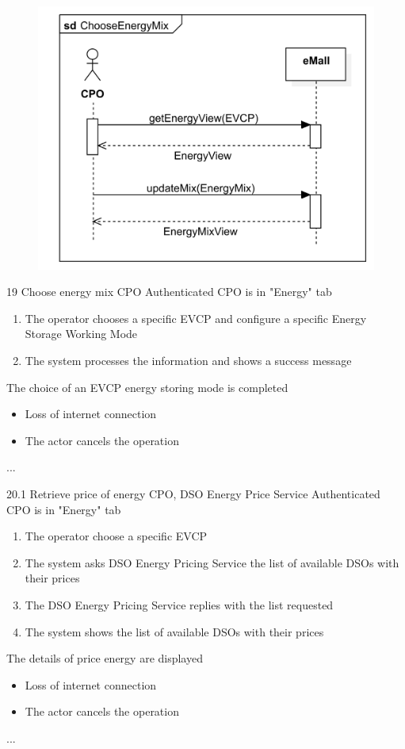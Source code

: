 \pagebreak
\usecase
{
    \begin{figure}[H]
        \centering
        \includegraphics[scale=0.9]{src/sequence_diagram/chooseEnergyMix.png}
    \end{figure}
}
{19}
{Choose energy mix} %
{CPO} %
{Authenticated CPO is in "Energy" tab} %
{ %
    \begin{enumerate}
        \item The operator chooses a specific EVCP and configure a specific Energy Storage Working Mode
        \item The system processes the information and shows a success message
    \end{enumerate}
}
{The choice of an EVCP energy storing mode is completed} %
{ %
    \begin{itemize}
        \item Loss of internet connection
        \item The actor cancels the operation
    \end{itemize}
}
{ %
    ...
}




\usecase
{
}
{20.1}
{Retrieve price of energy} %
{CPO, DSO Energy Price Service} %
{Authenticated CPO is in "Energy" tab} %
{ %
    \begin{enumerate}
        \item The operator choose a specific EVCP
        \item The system asks DSO Energy Pricing Service the list of available DSOs with their prices
        \item The DSO Energy Pricing Service replies with the list requested
        \item The system shows the list of available DSOs with their prices
    \end{enumerate}
}
{The details of price energy are displayed} %
{ %
    \begin{itemize}
        \item Loss of internet connection
        \item The actor cancels the operation
    \end{itemize}
}
{ %
    ...
}

